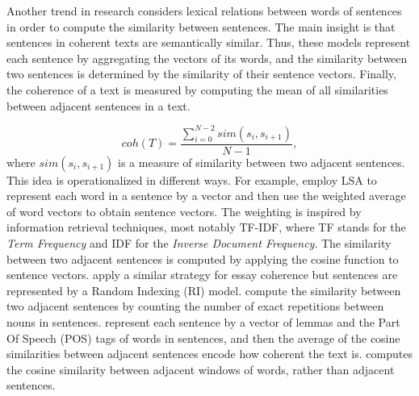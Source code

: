 Another trend in research considers lexical relations between words of sentences in order to compute the similarity between sentences.    
The main insight is that sentences in coherent texts are semantically similar. 
Thus, these models represent each sentence by aggregating the vectors of its words, and the similarity between two sentences is determined by the similarity of their sentence vectors. 
Finally, the coherence of a text is measured by computing the mean of all similarities between adjacent sentences in a text. 

\begin{equation}
coh(T) = \frac{\sum_{i=0}^{N-2}sim(s_i,s_{i+1})}{N-1},
\end{equation} 
%
where $sim(s_i, s_{i+1})$ is a measure of similarity between two adjacent sentences. 
This idea is operationalized in different ways.
For example,  employ LSA to represent each word in a sentence by a vector and then use the weighted average of word vectors to obtain sentence vectors. 
The weighting is inspired by information retrieval techniques, most notably TF-IDF, where TF stands for the \emph{Term Frequency} and IDF for the \emph{Inverse Document Frequency}.
The similarity between two adjacent sentences is computed by applying the cosine function to sentence vectors. 
 apply a similar strategy for essay coherence but sentences are represented by a Random Indexing (RI) model. 
 compute the similarity between two adjacent sentences by counting the number of exact repetitions between nouns in sentences. 
 represent each sentence by a vector of lemmas and the Part Of Speech (POS) tags of words in sentences, and then the average of the cosine similarities between adjacent sentences encode how coherent the text is. 
 computes the cosine similarity between adjacent windows of words, rather than adjacent sentences. 

